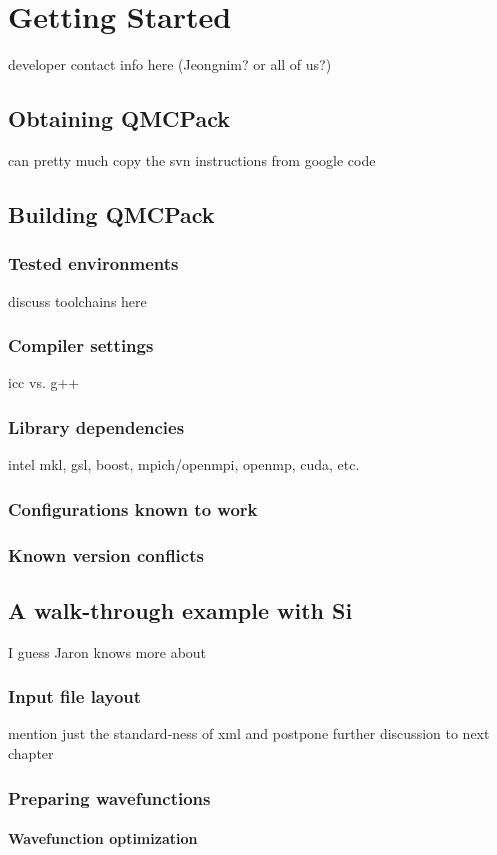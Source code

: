 \chapter{Getting Started}
developer contact info here (Jeongnim? or all of us?)
\section{Obtaining QMCPack}
can pretty much copy the svn instructions from google code
\section{Building QMCPack}
\subsection{Tested environments}
discuss toolchains here
\subsection{Compiler settings}
icc vs. g++
\subsection{Library dependencies}
intel mkl, gsl, boost, mpich/openmpi, openmp, cuda, etc.
\subsection{Configurations known to work}
\subsection{Known version conflicts}
\section{A walk-through example with Si}
I guess Jaron knows more about 
\subsection{Input file layout}
mention just the standard-ness of xml and postpone further discussion to next chapter
\subsection{Preparing wavefunctions}
\subsubsection{Wavefunction optimization}
